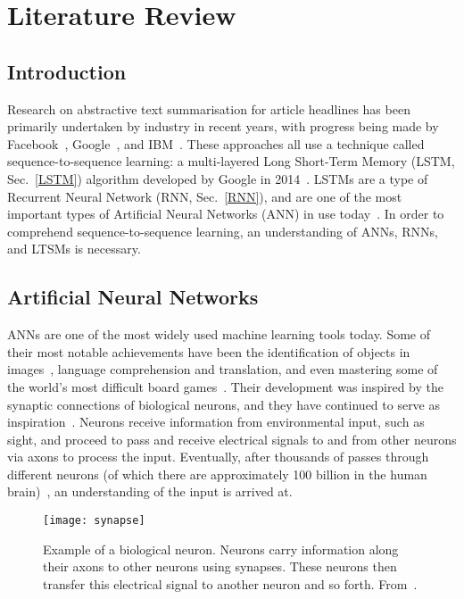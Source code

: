 \section{Literature Review}\label{litrev}

\subsection{Introduction}
Research on abstractive text summarisation for article headlines has been primarily undertaken by industry in recent years, with progress being made by Facebook~\cite{Rush2015,Chopra2016}, Google~\cite{Kannan2016}, and IBM~\cite{Nallapati2016}. These approaches all use a technique called sequence-to-sequence learning: a multi-layered Long Short-Term Memory (LSTM, Sec.~\ref{LSTM}) algorithm developed by Google in 2014~\cite{Sutskever2014}. LSTMs are a type of Recurrent Neural Network (RNN, Sec.~\ref{RNN}), and are one of the most important types of Artificial Neural Networks (ANN) in use today~\cite{Schmidhuber2015}.  In order to comprehend sequence-to-sequence learning, an understanding of ANNs, RNNs, and LTSMs is necessary.

\subsection{Artificial Neural Networks}
ANNs are one of the most widely used machine learning tools today. Some of their most notable achievements have been the identification of objects in images~\cite{LeCun1989}, language comprehension and translation\cite{Mikolov2010,Mikolov2011}, and even mastering some of the world's most difficult board games~\cite{Silver2016a}. Their development was inspired by the synaptic connections of biological neurons, and they have continued to serve as inspiration~\cite{Schmidhuber2015}. Neurons receive information from environmental input, such as sight, and proceed to pass and receive electrical signals to and from other neurons via axons to process the input. Eventually, after thousands of passes through different neurons (of which there are approximately 100 billion in the human brain)~\cite{Goodfellow-et-al-2016}, an understanding of the input is arrived at.

\begin{SCfigure}[1][h]
  \caption{Example of a biological neuron. Neurons carry information along their axons to other neurons using synapses. These neurons then transfer this electrical signal to another neuron and so forth. From~\cite{Rodgers2002}.}
  \texttt{[image: synapse]}
  \label{fig:synapse}
\end{SCfigure}


